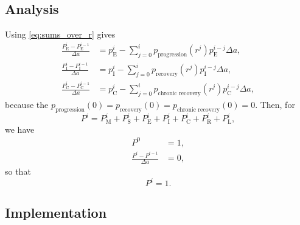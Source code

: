 \documentclass[12pt]{article}
\begin{document}
\subsection{Analysis}

Using \eqref{eq:sums_over_r} gives
\begin{subequations}
  \begin{align}
    \frac{P_{\mathrm{E}}^i - P_{\mathrm{E}}^{i - 1}}{\Delta a}
    &= p_{\mathrm{E}}^i
      - \sum_{j = 0}^i
      p_{\text{progression}}(r^j)
      p_{\mathrm{E}}^{i - j} \Delta a,
    \\
    \frac{P_{\mathrm{I}}^i - P_{\mathrm{I}}^{i - 1}}{\Delta a}
    &= p_{\mathrm{I}}^i
      - \sum_{j = 0}^i
      p_{\text{recovery}}(r^j)
      p_{\mathrm{I}}^{i - j} \Delta a,
    \\
    \frac{P_{\mathrm{C}}^i - P_{\mathrm{C}}^{i - 1}}{\Delta a}
    &= p_{\mathrm{C}}^i
      - \sum_{j = 0}^i
      p_{\text{chronic recovery}}(r^j)
      p_{\mathrm{C}}^{i - j} \Delta a,
  \end{align}
\end{subequations}
because the $p_{\text{progression}}(0) = p_{\text{recovery}}(0) =
p_{\text{chronic recovery}}(0) = 0$. Then, for
\begin{equation}
  P^i = P_{\mathrm{M}}^i + P_{\mathrm{S}}^i +
  P_{\mathrm{E}}^i + P_{\mathrm{I}}^i + P_{\mathrm{C}}^i +
  P_{\mathrm{R}}^i + P_{\mathrm{L}}^i,
\end{equation}
we have
\begin{subequations}
  \begin{align}
    P^0 &= 1,
    \\
    \frac{P^i - P^{i - 1}}{\Delta a} &= 0,
  \end{align}
\end{subequations}
so that
\begin{equation}
  P^i = 1.
\end{equation}


\subsection{Implementation}
\end{document}
